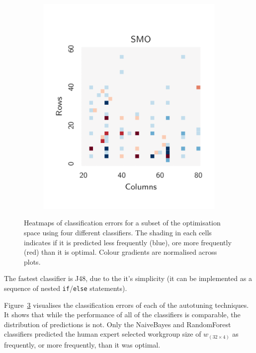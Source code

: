 \documentclass[nonatbib,preprint,9pt]{sigplanconf}
\begin{document}
\begin{figure}
\begin{subfigure}[t]{0.48\columnwidth}
\vspace{-1.5em} %
\caption{}
\label{fig:class-hmaps-3}
\end{subfigure}
\begin{subfigure}[t]{0.48\columnwidth}
\centering
\includegraphics[width=\columnwidth]{img/heatmap_5}
\vspace{-1.5em} %
\caption{}
\label{fig:class-hmaps-4}
\end{subfigure}
\caption{%
  Heatmaps of classification errors for a subset of the optimisation
  space using four different classifiers. The shading in each cells
  indicates if it is predicted less frequently (blue), ore more
  frequently (red) than it is optimal. Colour gradients are normalised
  across plots.%
}
\label{fig:class-hmaps}
\end{figure}

The fastest classifier is J48, due to the it's simplicity (it can be
implemented as a sequence of nested \texttt{if}/\texttt{else}
statements).

Figure~\ref{fig:class-hmaps} visualises the classification errors of
each of the autotuning techniques. It shows that while the performance
of all of the classifiers is comparable, the distribution of
predictions is not. Only the NaiveBayes and RandomForest classifiers
predicted the human expert selected workgroup size of
$w_{(32 \times 4)}$ as frequently, or more frequently, than it was
optimal.
\end{document}
